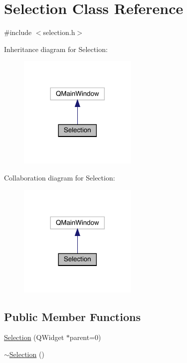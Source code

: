 \hypertarget{class_selection}{}\section{Selection Class Reference}
\label{class_selection}


{\ttfamily \#include $<$selection.\+h$>$}



Inheritance diagram for Selection\+:
\nopagebreak
\begin{figure}[H]
\begin{center}
\leavevmode
\includegraphics[width=161pt]{class_selection__inherit__graph}
\end{center}
\end{figure}


Collaboration diagram for Selection\+:
\nopagebreak
\begin{figure}[H]
\begin{center}
\leavevmode
\includegraphics[width=161pt]{class_selection__coll__graph}
\end{center}
\end{figure}
\subsection*{Public Member Functions}
\begin{DoxyCompactItemize}
\item 
\mbox{\hyperlink{class_selection_ab6a737100a92cf8dd040b6b7b439c5c1}{Selection}} (Q\+Widget $\ast$parent=0)
\item 
\mbox{\hyperlink{class_selection_a1860ec524d11c03de8c10a9354319839}{$\sim$\+Selection}} ()
\end{DoxyCompactItemize}


